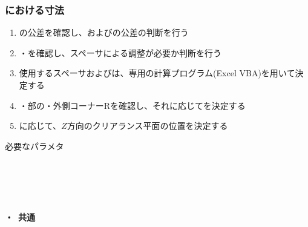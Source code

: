 \subsubsection{\EndFacecutMilling における寸法}
\begin{enumerate}[label=\sarrow]
\item {}\nameWorkTotalLength の公差を確認し、\TopAlocationLength および\BottomAlocationLength の公差の判断を行う
\item \TopAlocationLength・\BottomAlocationLength を確認し、スペーサによる調整が必要か判断を行う
\item 使用するスペーサおよび\ReAlocationLength は、専用の計算プログラム(Excel VBA)を用いて決定する
\item \OuterDiameter・\nameEndFace 部の\nameThickness・\nameEndFace 外側コーナーRを確認し、それに応じて\TDCValue を決定する
\item \ReAlocationLength に応じて、$Z$方向のクリアランス平面の位置を決定する
\end{enumerate}
\begin{Parameter}{必要なパラメタ}
\paragraph*{\ReAlocationLength}
\PMWorkTotalLength
\PMTopAlocationLength
\PMBottomAlocationLength
\PMACOD
\PMJigLength
{}
\tcbline*
\paragraph*{\TopEndFacecut}
\PMTopReAlocationLength
\PMACOD
\PMBDOD
\PMODCornerR\\
\PMTopEndACID
\PMTopEndBDID
{}
\tcbline*
\paragraph*{\BottomEndFacecut}
\PMBottomReAlocationLength
\PMACOD
\PMBDOD
\PMODCornerR\\
\PMBottomEndACID
\PMBottomEndBDID
{}
\tcbline*
\paragraph*{\TopEndFacecut・\BottomEndFacecut~共通}
\end{Parameter}

